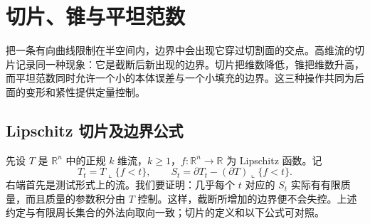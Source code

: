 
% 
% 

\section{切片、锥与平坦范数}
\label{g3:sec:2203}

把一条有向曲线限制在半空间内，边界中会出现它穿过切割面的交点。高维流的切片记录同一种现象：它是截断后新出现的边界。切片把维数降低，锥把维数升高，而平坦范数同时允许一个小的本体误差与一个小填充的边界。这三种操作共同为后面的变形和紧性提供定量控制。

\subsection{Lipschitz 切片及边界公式}
\label{g3:subsec:2203:01}
先设 \(T\) 是 \(\mathbb R^n\) 中的正规 \(k\) 维流，\(k\ge1\)，\(f:\mathbb R^n\to\mathbb R\) 为 Lipschitz 函数。记
\[
	T_t=T\llcorner\{f<t\},\qquad
	S_t=\partial T_t-(\partial T)\llcorner\{f<t\}.
\]
右端首先是测试形式上的流。我们要证明：几乎每个 \(t\) 对应的 \(S_t\) 实际有有限质量，而且质量的参数积分由 \(T\) 控制。这样，截断所增加的边界便不会失控。上述约定与有限周长集合的外法向取向一致；切片的定义和以下公式可对照\cite[第28节，第156--162页]{Simon1983}。

